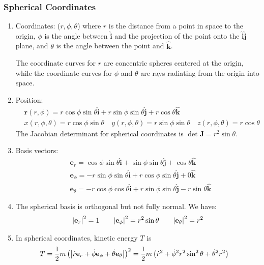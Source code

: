 \documentclass[11pt, a4paper]{article}
\newcommand{\e}{\mathbf{e}} %
\newcommand{\uvec}[1]{\bm{\hat{\mathbf{#1}}}} %
\begin{document}
\subsubsection{Spherical Coordinates}
\begin{enumerate}
	\item Coordinates: ($ r, \phi, \theta $) where $ r $ is the distance from a point in space to the origin, $ \phi $ is the angle between $ \uvec{i} $ and the projection of the point onto the $ \uvec{i} \uvec{j} $ plane, and $ \theta $ is the angle between the point and $ \uvec{k} $.
	
	
	The coordinate curves for $ r $ are concentric spheres centered at the origin, while the coordinate curves for $ \phi $ and $ \theta $ are rays radiating from the origin into space.
	\item Position: 
	\begin{align*}
		& \bm{r}(r, \phi) = r \cos \phi \sin \theta \uvec{i} + r \sin \phi \sin \theta \uvec{j} + r \cos \theta \uvec{k}\\
	 	&x(r, \phi, \theta) = r \cos \phi \sin \theta \quad y(r, \phi, \theta) = r \sin \phi \sin \theta \quad z(r, \phi, \theta) = r \cos \theta
	\end{align*}
	The Jacobian determinant for spherical coordinates is $ \det \mathbf{J} = r^2 \sin \theta $.
	\item Basis vectors:
	\begin{align*}
		&\e_{r} = \cos \phi \sin \theta \uvec{i} + \sin \phi \sin \theta \uvec{j} + \cos \theta \uvec{k}\\
		& \e_{\phi} = - r \sin \phi \sin \theta \uvec{i} + r \cos \phi \sin \theta \uvec{j} + 0 \uvec{k}\\
		& \e_{\theta} = - r \cos \phi \cos \theta \uvec{i} + r \sin \phi \sin \theta \uvec{j} - r \sin \theta \uvec{k}
	\end{align*}
	
	\item The spherical basis is orthogonal but not fully normal. We have: 
	\begin{align*}
	 \abs{\e_r}^2 = 1 \qquad  \abs{\e_\phi}^2 = r^2 \sin \theta \qquad \abs{\e_\theta}^2 = r^2
	\end{align*}
	
	\item In spherical coordinates, kinetic energy $ T $ is
	\begin{align*}
		&T = \frac{1}{2}m \left (\abs{\dot{r} \e_r + \dot{\phi} \e_\phi + \dot{\theta} \e_\theta} \right )^2 = \frac{1}{2}m \left(\dot{r}^2 + \dot{\phi}^2 r^2 \sin^2 \theta + \dot{\theta}^2r^2 \right)
	\end{align*}
\end{enumerate}
\end{document}
